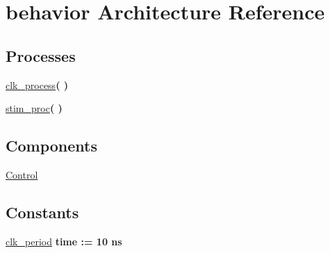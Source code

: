 \hypertarget{class_control__tb_1_1behavior}{\section{behavior \-Architecture \-Reference}
\label{class_control__tb_1_1behavior}
}
\*
\*
\subsection*{\-Processes}
 \begin{DoxyCompactItemize}
\item 
\hyperlink{class_control__tb_1_1behavior_ac5bb218131b813f7908ec89476b31fca}{clk\-\_\-process}{\bfseries  (  )}
\item 
\hyperlink{class_control__tb_1_1behavior_ad2efa6785cff833c341e27596b21aeb5}{stim\-\_\-proc}{\bfseries  (  )}
\end{DoxyCompactItemize}
\subsection*{\-Components}
 \begin{DoxyCompactItemize}
\item 
\hyperlink{class_control__tb_1_1behavior_ae13bdad23d6f2d32595962543b489fb9}{\-Control}  {\bfseries }  
\end{DoxyCompactItemize}
\subsection*{\-Constants}
 \begin{DoxyCompactItemize}
\item 
\hyperlink{class_control__tb_1_1behavior_a13e9f2c03e76b8759ca75c4759b3aed6}{clk\-\_\-period} {\bfseries time  \-:=  10  ns } 
\end{DoxyCompactItemize}
